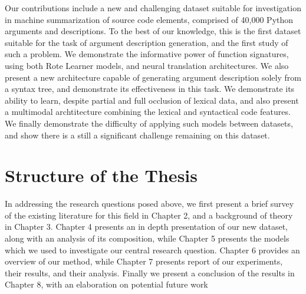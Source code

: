 Our contributions include a new and challenging dataset suitable for investigation in machine summarization of source code elements, comprised of 40,000 Python arguments and descriptions.
To the best of our knowledge, this is the first dataset suitable for the task of argument description generation, and the first study of such a problem.
We demonstrate the informative power of function signatures, using both Rote Learner models, and neural translation architectures.
We also present a new architecture capable of generating argument description solely from a syntax tree, and demonstrate its effectiveness in this task.
We demonstrate its ability to learn, despite partial and full occlusion of lexical data, and also present a multimodal archtitecture combining the lexical and syntactical code features.
We finally demonstrate the difficulty of applying such models between datasets, and show there is a still a significant challenge remaining on this dataset.


\section{Structure of the Thesis} %
\label{sec:structure_of_the_thesis}

In addressing the research questions posed above, we first present a brief survey of the existing literature for this field in Chapter 2, and a background of theory in Chapter 3.
Chapter 4 presents an in depth presentation of our new dataset, along with an analysis of its composition, while Chapter 5 presents the models which we used to investigate our central research question. 
Chapter 6 provides an overview of our method, while Chapter 7 presents  report of our experiments, their results, and their analysis.
Finally we present a conclusion of the results in Chapter 8, with an elaboration on potential future work









